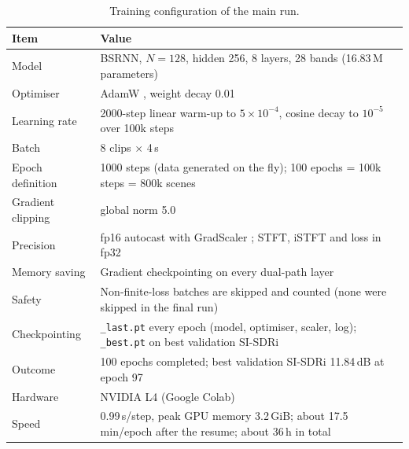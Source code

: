 \documentclass[11pt,a4paper]{article}
\newcommand{\sisdri}{SI-SDRi}
\begin{document}
\begin{table}[H]
\centering\footnotesize
\caption{Training configuration of the main run.}
\label{tab:hparams}
\begin{tabularx}{\textwidth}{@{}>{\raggedright\arraybackslash}p{3.5cm} Y@{}}
\toprule
Item & Value\\
\midrule
Model & BSRNN, $N=128$, hidden 256, 8 layers, 28 bands (16.83\,M parameters)\\
Optimiser & AdamW \cite{loshchilov2019adamw}, weight decay 0.01\\
Learning rate & 2000-step linear warm-up to $5\times10^{-4}$, cosine decay \cite{loshchilov2017sgdr}
  to $10^{-5}$ over 100k steps\\
Batch & 8 clips $\times$ 4\,s\\
Epoch definition & 1000 steps (data generated on the fly); 100 epochs = 100k steps = 800k scenes\\
Gradient clipping & global norm 5.0\\
Precision & fp16 autocast with GradScaler \cite{micikevicius2018mixed}; STFT, iSTFT and loss in fp32\\
Memory saving & Gradient checkpointing \cite{chen2016checkpointing} on every dual-path layer\\
Safety & Non-finite-loss batches are skipped and counted (none were skipped in the final run)\\
Checkpointing & \texttt{\_last.pt} every epoch (model, optimiser, scaler, log); \texttt{\_best.pt}
  on best validation \sisdri\\
Outcome & 100 epochs completed; best validation \sisdri{} 11.84\,dB at epoch 97\\
Hardware & NVIDIA L4 (Google Colab)\\
Speed & 0.99\,s/step, peak GPU memory 3.2\,GiB; about 17.5\,min/epoch after the resume; about
  36\,h in total\\
\bottomrule
\end{tabularx}
\end{table}
\end{document}
